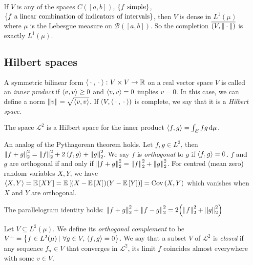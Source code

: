 \begin{remark}
	If \( V \) is any of the spaces \( C([a,b]) \), \( \qty{f \text{ simple}} \), \( \qty{f \text{ a linear combination of indicators of intervals}} \), then \( V \) is dense in \( L^1(\mu) \) where \( \mu \) is the Lebesgue measure on \( \mathcal B([a,b]) \).
	So the completion \( \overline{(V,\norm{{}\cdot{}})} \) is exactly \( L^1(\mu) \).
\end{remark}

\subsection{Hilbert spaces}
\begin{definition}
	A symmetric bilinear form \( \left\langle{{}\cdot{}, {}\cdot{}}\right\rangle \colon V \times V \to \mathbb R \) on a real vector space \( V \) is called an \emph{inner product} if \( \left\langle{v,v}\right\rangle \geq 0 \) and \( \left\langle{v,v}\right\rangle = 0 \) implies \( v = 0 \).
	In this case, we can define a norm \( \norm{v} = \sqrt{\left\langle{v,v}\right\rangle} \).
	If \( (V,\left\langle{{}\cdot{},{}\cdot{}}\right\rangle) \) is complete, we say that it is a \emph{Hilbert space}.
\end{definition}
\begin{corollary}
	The space \( \mathcal L^2 \) is a Hilbert space for the inner product \( \left\langle{f,g}\right\rangle = \int_E fg \dd{\mu} \).
\end{corollary}
\begin{example}
	An analog of the Pythagorean theorem holds.
	Let \( f, g \in L^2 \), then \( \norm{f + g}_2^2 = \norm{f}_2^2 + 2\left\langle{f,g}\right\rangle + \norm{g}_2^2 \).
	We say \( f \) is \emph{orthogonal} to \( g \) if \( \left\langle{f,g}\right\rangle = 0 \).
	\( f \) and \( g \) are orthogonal if and only if \( \norm{f + g}_2^2 = \norm{f}_2^2 + \norm{g}_2^2 \).
	For centred (mean zero) random variables \( X, Y \), we have \( \left\langle{X,Y}\right\rangle = \mathbb{E}\left[{XY}\right] = \mathbb{E}\left[{(X - \mathbb{E}\left[{X}\right])(Y - \mathbb{E}\left[{Y}\right])}\right] = \operatorname{Cov}\left({X,Y}\right) \) which vanishes when \( X \) and \( Y \) are orthogonal.
\end{example}
\begin{example}
	The parallelogram identity holds: \( \norm{f+g}_2^2 + \norm{f-g}_2^2 = 2 \qty(\norm{f}_2^2 + \norm{g}_2^2) \)
\end{example}
\begin{definition}
	Let \( V \subseteq L^2(\mu) \).
	We define its \emph{orthogonal complement} to be \( V^\perp = \qty{f \in L^2(\mu) \mid \forall g \in V,\, \left\langle{f,g}\right\rangle = 0} \).
	We say that a subset \( V \) of \( \mathcal L^2 \) is \emph{closed} if any sequence \( f_n \in V \) that converges in \( \mathcal L^2 \), its limit \( f \) coincides almost everywhere with some \( v \in V \).
\end{definition}
